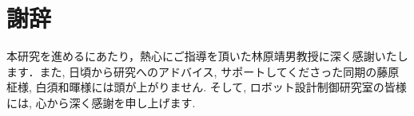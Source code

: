 \chapter*{謝辞}

本研究を進めるにあたり，熱心にご指導を頂いた林原靖男教授に深く感謝いたします．また, 日頃から研究へのアドバイス, サポートしてくださった同期の藤原柾様, 白須和暉様には頭が上がりません. そして, ロボット設計制御研究室の皆様には, 心から深く感謝を申し上げます. 
%
